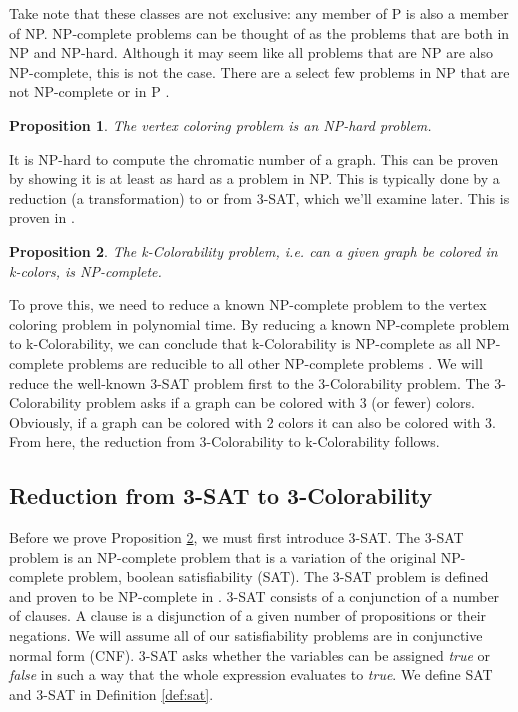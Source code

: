 \documentclass{article}
\newtheorem{prop}{Proposition}
\theoremstyle{definition}
\begin{document}
Take note that these classes are not exclusive: any member of P is also a member of NP. NP-complete problems can be thought of as the problems that are both in NP and NP-hard. Although it may seem like all problems that are NP are also NP-complete, this is not the case. There are a select few problems in NP that are not NP-complete or in P \cite{ladner1975structure}.

\begin{prop}
The vertex coloring problem is an NP-hard problem.
\end{prop}

It is NP-hard to compute the chromatic number of a graph. This can be proven by showing it is at least as hard as a problem in NP. This is typically done by a reduction (a transformation) to or from 3-SAT, which we'll examine later. This is proven in \cite{garey}.

\begin{prop}\label{prop:k-color-np-complete}
The k-Colorability problem, i.e. can a given graph be colored in k-colors, is NP-complete.
\end{prop}

To prove this, we need to reduce a known NP-complete problem to the vertex coloring problem in polynomial time. By reducing a known NP-complete problem to k-Colorability, we can conclude that k-Colorability is NP-complete as all NP-complete problems are reducible to all other NP-complete problems \cite{gareynp}. We will reduce the well-known 3-SAT problem first to the 3-Colorability problem. The 3-Colorability problem asks if a graph can be colored with 3 (or fewer) colors. Obviously, if a graph can be colored with 2 colors it can also be colored with 3.  From here, the reduction from 3-Colorability to k-Colorability follows.

\subsection{Reduction from 3-SAT to 3-Colorability}
Before we prove Proposition \ref{prop:k-color-np-complete}, we must first introduce 3-SAT.  The 3-SAT problem is an NP-complete problem that is a variation of the original NP-complete problem, boolean satisfiability (SAT). The 3-SAT problem is defined and proven to be NP-complete in \cite{gareynp}. 3-SAT consists of a conjunction of a number of clauses. A clause is a disjunction of a given number of propositions or their negations. We will assume all of our satisfiability problems are in conjunctive normal form (CNF). 3-SAT asks whether the variables can be assigned \emph{true} or \emph{false} in such a way that the whole expression evaluates to \emph{true}. We define SAT and 3-SAT in Definition \ref{def:sat}.
\end{document}
